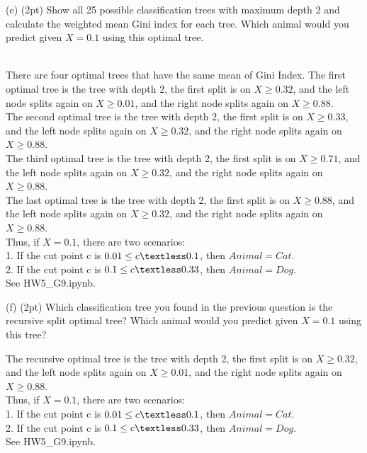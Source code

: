 \documentclass[11pt, oneside]{exam}   	%
\begin{document}
(e) (2pt)
Show all 25 possible classification trees with maximum depth 2 and calculate the weighted mean Gini index for each tree.
Which animal would you predict given $X=0.1$ using this optimal tree.
\begin{solution}
\\
There are four optimal trees that have the same mean of Gini Index. The first optimal tree is the tree with depth 2, the first split is on $X\geq 0.32$, and the left node splits again on  $X\geq 0.01$, and the right node splits again on  $X\geq 0.88$. 
\\ The second optimal tree is the tree with depth 2, the first split is on $X\geq 0.33$, and the left node splits again on $X\geq 0.32$, and the right node splits again on  $X\geq 0.88$. 
\\ The third optimal tree is the tree with depth 2, the first split is on $X\geq 0.71$, and the left node splits again on $X\geq 0.32$, and the right node splits again on  $X\geq 0.88$.
\\ The last optimal tree is the tree with depth 2, the first split is on $X\geq 0.88$, and the left node splits again on $X\geq 0.32$, and the right node splits again on  $X\geq 0.88$. \\

Thus, if $X=0.1$, there are two scenarios: \\
    1. If the cut point c is $0.01\leq c\textless 0.1$, then $Animal = Cat$. \\
    2. If the cut point c is $0.1\leq c\textless 0.33$, then $Animal = Dog$.  \\

See HW5\_G9.ipynb.


\end{solution}
(f)  (2pt)
Which classification tree you found in the previous question is the recursive split optimal tree? Which animal would you predict given $X=0.1$ using this tree?
\begin{solution}
The recursive optimal tree is the tree with depth 2, the first split is on $X\geq 0.32$, and the left node splits again on  $X\geq 0.01$, and the right node splits again on $X\geq 0.88$. \\

Thus, if $X=0.1$, there are two scenarios: \\
    1. If the cut point c is $0.01\leq c\textless 0.1$, then $Animal = Cat$. \\
    2. If the cut point c is $0.1\leq c\textless 0.33$, then $Animal = Dog$.  \\

See HW5\_G9.ipynb.
\end{solution}
\end{document}
